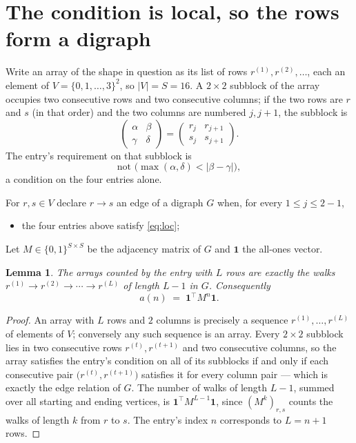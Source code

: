 \documentclass[11pt,a4paper]{article}
\theoremstyle{plain}
\newtheorem{lemma}[theorem]{Lemma}
\theoremstyle{definition}
\begin{document}
\section{The condition is local, so the rows form a digraph}

Write an array of the shape in question as its list of rows
$r^{(1)},r^{(2)},\dots$, each an element of
$V=\{0,1,\dots,3\}^{2}$, so $|V|=S=16$. A $2\times2$ subblock of the array
occupies two consecutive rows and two consecutive columns; if the two rows are $r$
and $s$ (in that order) and the two columns are numbered $j,j+1$,
the subblock is
\[
\begin{pmatrix}\alpha&\beta\\\gamma&\delta\end{pmatrix}=\begin{pmatrix}r_j&r_{j+1}\\s_j&s_{j+1}\end{pmatrix}.
\]
The entry's requirement on that subblock is
\begin{equation}\label{eq:loc}
\text{not }\bigl(\max(\alpha,\delta)<|\beta-\gamma|\bigr),
\end{equation}
a condition on the four entries alone.

For $r,s\in V$ declare $r\to s$ an edge of a digraph $G$ when, for every
$1\le j\le 2-1$,
\begin{itemize}
\item the four entries above satisfy \eqref{eq:loc};

\end{itemize}
Let $M\in\{0,1\}^{S\times S}$ be the adjacency matrix of $G$ and $\mathbf{1}$ the
all-ones vector.

\begin{lemma}\label{lem:walk}
The arrays counted by the entry with $L$ rows are exactly the walks
$r^{(1)}\to r^{(2)}\to\cdots\to r^{(L)}$ of length $L-1$ in $G$. Consequently
\[
a(n)\;=\;\mathbf{1}^{\!\top}M^{n}\mathbf{1} .
\]
\end{lemma}

\begin{proof}
An array with $L$ rows and $2$ columns is precisely a sequence
$r^{(1)},\dots,r^{(L)}$ of elements of $V$; conversely any such sequence is an array.
Every $2\times2$ subblock lies in two consecutive rows $r^{(t)},r^{(t+1)}$ and two
consecutive columns, so the array satisfies the entry's condition on all of its subblocks
if and only if each consecutive pair $\bigl(r^{(t)},r^{(t+1)}\bigr)$ satisfies it for
every column pair --- which is exactly the edge relation of $G$. The number of walks of
length $L-1$, summed over all starting and ending vertices, is
$\mathbf{1}^{\!\top}M^{L-1}\mathbf{1}$, since $(M^{k})_{r,s}$ counts the walks of
length $k$ from $r$ to $s$. The entry's index $n$ corresponds to $L=n+1$ rows.
\end{proof}
\end{document}
